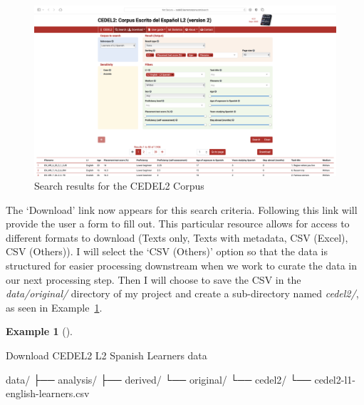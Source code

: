 \documentclass[
  letterpaper,
  DIV=11,
  numbers=noendperiod]{scrreport}
\newenvironment{Shaded}{\begin{snugshade}}{\end{snugshade}}
\newcommand{\ExtensionTok}[1]{\textcolor[rgb]{0.00,0.00,0.00}{#1}}
\newcommand{\NormalTok}[1]{\textcolor[rgb]{0.00,0.00,0.00}{#1}}
\theoremstyle{definition}
\newtheorem{example}{Example}[chapter]
\theoremstyle{remark}
\begin{document}
\begin{figure}[H]

{\centering \includegraphics[width=1\textwidth,height=\textheight]{figures/acquire-data/ad-cedel2-results.png}

}

\caption{\label{fig-ad-cedel2-results}Search results for the CEDEL2
Corpus}

\end{figure}

The `Download' link now appears for this search criteria. Following this
link will provide the user a form to fill out. This particular resource
allows for access to different formats to download (Texts only, Texts
with metadata, CSV (Excel), CSV (Others)). I will select the `CSV
(Others)' option so that the data is structured for easier processing
downstream when we work to curate the data in our next processing step.
Then I will choose to save the CSV in the \emph{data/original/}
directory of my project and create a sub-directory named \emph{cedel2/},
as seen in Example~\ref{exm-ad-cedel2-learners-download}.

\begin{example}[]\protect\hypertarget{exm-ad-cedel2-learners-download}{}\label{exm-ad-cedel2-learners-download}

Download CEDEL2 L2 Spanish Learners data

\begin{Shaded}
\begin{Highlighting}[]
\ExtensionTok{data/}
\ExtensionTok{├──}\NormalTok{ analysis/}
\ExtensionTok{├──}\NormalTok{ derived/}
\ExtensionTok{└──}\NormalTok{ original/}
    \ExtensionTok{└──}\NormalTok{ cedel2/}
       \ExtensionTok{└──}\NormalTok{ cedel2{-}l1{-}english{-}learners.csv}
\end{Highlighting}
\end{Shaded}

\end{example}
\end{document}
